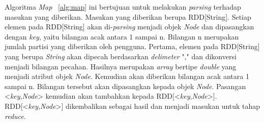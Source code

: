 \begin{algorithm}[H]
	\label{alg:patern}
	\DontPrintSemicolon\SetAlgoNoLine\LinesNumbered
	
\end{algorithm}
 
Algoritma \textit{Map} ~\ref{alg:map} ini bertujuan untuk melakukan \textit{parsing} terhadap masukan yang diberikan. Masukan yang diberikan berupa RDD[String]. Setiap elemen pada RDD[String] akan di-\textit{parsing} menjadi objek \textit{Node} dan dipasangkan dengan \textit{key}, yaitu bilangan acak antara 1 sampai n. Bilangan n merupakan jumlah partisi yang diberikan oleh pengguna. Pertama, elemen pada RDD[String] yang berupa \textit{String} akan dipecah berdasarkan \textit{delimeter} "," dan dikonversi menjadi bilangan pecahan. Hasilnya merupakan \textit{array} bertipe \textit{double} yang menjadi atribut objek \textit{Node}. Kemudian akan diberikan bilangan acak antara 1 sampai n. Bilangan tersebut akan dipasangkan kepada objek \textit{Node}. Pasangan <\textit{key},\textit{Node}> kemudian akan tambahkan kepada RDD[<\textit{key},\textit{Node}>]. RDD[<\textit{key},\textit{Node}>] dikembalikan sebagai hasil dan menjadi masukan untuk tahap \textit{reduce}.\\


